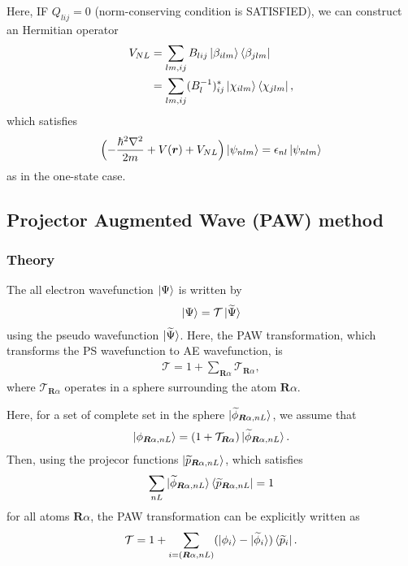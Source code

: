 \documentclass{article}
\begin{document}
Here, IF $Q_{lij} = 0$ (norm-conserving condition is SATISFIED), we can construct an Hermitian operator
\begin{align}
  V_{NL} 
  &= 
  \sum_{lm,ij} B_{lij} \ket{\beta_{ilm}} \bra{\beta_{jlm}}
  \nonumber
  \\&=
  \sum_{lm,ij} (B_{l}^{-1})_{ij}^* \ket{\chi_{ilm}} \bra{\chi_{jlm}},
\end{align}
which satisfies
\begin{align}
  \Bigl(
    - \frac{\hbar^2\nabla^2}{2m} + V(\bm{r}) + V_{NL}
  \Bigr)
  \ket{\psi_{nlm}} = \epsilon_{nl}\ket{\psi_{nlm}}
\end{align}
as in the one-state case.


\subsection{Projector Augmented Wave (PAW) method}
\subsubsection{Theory}
The all electron wavefunction $\ket{\Psi}$ is written by 
\begin{align}
\ket{\Psi} = \mathcal{T} \ket{\widetilde{\Psi}}
\end{align}
using the pseudo wavefunction $\ket{\widetilde{\Psi}}$. Here, the PAW transformation, which transforms the PS wavefunction to AE wavefunction, is 
\begin{align}
  \mathcal{T} = 1 + \sum_{\bm{R}\alpha} \mathcal{T}_{\bm{R}\alpha},
\end{align}
where $\mathcal{T}_{\bm{R}\alpha}$ operates in a sphere surrounding the atom $\bm{R}\alpha$.

Here, for a set of complete set in the sphere $\ket{\widetilde{\phi}_{\bm{R}\alpha, nL}}$, we assume that 
\begin{align}
  \ket{{\phi}_{\bm{R}\alpha, nL}} = (1 + \mathcal{T}_{\bm{R}\alpha}) \ket{\widetilde{\phi}_{\bm{R}\alpha, nL}}.
\end{align}
Then, using the projecor functions $\ket{\widetilde{p}_{\bm{R}\alpha,nL}}$, which satisfies
\begin{align} 
  \sum_{nL} \ket{\widetilde{\phi}_{\bm{R}\alpha, nL}} \bra{\widetilde{p}_{\bm{R}\alpha, nL}} = 1
\end{align}
for all atoms $\bm{R}\alpha$, the PAW transformation can be explicitly written as 
\begin{align}
  \mathcal{T} = 1 + \sum_{i = (\bm{R}\alpha, nL)} (\ket{\phi_i} - \ket{\widetilde{\phi}_i}) \bra{\widetilde{p}_i}.
\end{align}
\end{document}
